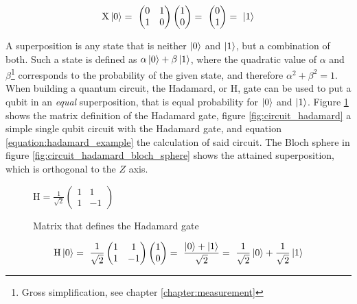 \begin{equation}
    \centering
    \begin{split}
        \mathrm{X}\ket{0} =\ \begin{pmatrix} 0 & 1 \\ 1 & 0 \end{pmatrix}\begin{pmatrix}1 \\ 0\end{pmatrix} =\ \begin{pmatrix}0 \\ 1\end{pmatrix} =\ \ket{1}
    \end{split}
    \label{equation:pauli_x_example}
\end{equation}

A superposition is any state that is neither $\ket{0}$ and $\ket{1}$, but a combination of both. Such a state is defined as $\alpha\ket{0} + \beta\ket{1}$, where the quadratic value of $\alpha$ and $\beta$\footnote{Gross simplification, see chapter \ref{chapter:measurement}} corresponds to the probability of the given state, and therefore $\alpha^2 + \beta^2 = 1$. When building a quantum circuit, the Hadamard, or $\mathrm{H}$\cite{qiskit_hgate_nodate}, gate can be used to put a qubit in an \emph{equal} superposition, that is equal probability for $\ket{0}$ and $\ket{1}$. Figure \ref{fig:matrix_hadamard} shows the matrix definition of the Hadamard gate, figure \ref{fig:circuit_hadamard} a simple single qubit circuit with the Hadamard gate, and equation \ref{equation:hadamard_example} the calculation of said circuit. The Bloch sphere in figure \ref{fig:circuit_hadamard_bloch_sphere} shows the attained superposition, which is orthogonal to the $Z$ axis.

\begin{figure}[!h]
    \centering
    $\mathrm{H} = \frac{1}{\sqrt{2}}\begin{pmatrix}1 & 1 \\1 & -1\end{pmatrix}$
    \caption{Matrix that defines the Hadamard gate}
    \label{fig:matrix_hadamard}
\end{figure}

\begin{equation}
    \centering
    \begin{split}
        \mathrm{H}\ket{0} =\ \frac{1}{\sqrt{2}}\begin{pmatrix}1 & 1 \\1 & -1\end{pmatrix}\begin{pmatrix}1 \\ 0\end{pmatrix} =\ \frac{\ket{0} + \ket{1}}{\sqrt{2}} =\ \frac{1}{\sqrt{2}}\ket{0} + \frac{1}{\sqrt{2}}\ket{1}
    \end{split}
    \label{equation:hadamard_example}
\end{equation}


